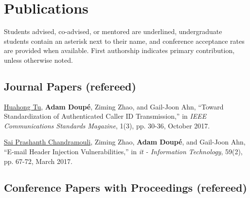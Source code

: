 \documentclass[11pt,letterpaper,sans]{moderncv}
\begin{document}
\section{Publications}

Students advised, co-advised, or mentored are underlined,
undergraduate students contain an asterisk next to their name, and
conference acceptance rates are provided when available. First
authorship indicates primary contribution, unless otherwise noted.

\subsection{Journal Papers (refereed)}

\begin{etaremune}

\item \underline{Huahong Tu}, \textbf{Adam Doup\'e}, Ziming Zhao, and
  Gail-Joon Ahn, ``Toward Standardization of Authenticated Caller ID
  Transmission,'' in \emph{IEEE Communications Standards Magazine},
    1(3), pp. 30-36, October 2017.

\item \underline{Sai Prashanth Chandramouli}, Ziming Zhao,
  \textbf{Adam Doup\'e}, and Gail-Joon Ahn, ``E-mail Header Injection
  Vulnerabilities,'' in \emph{it - Information Technology}, 59(2), pp.
  67-72, March 2017.

\end{etaremune}

\subsection{Conference Papers with Proceedings (refereed)}
\end{document}
